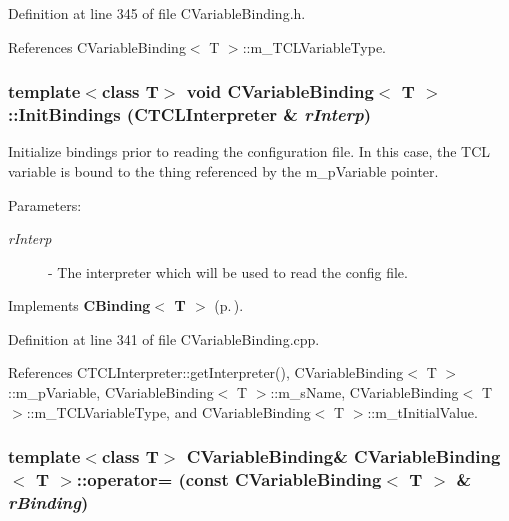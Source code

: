 Definition at line 345 of file CVariable\-Binding.h.

References CVariable\-Binding$<$ T $>$::m\_\-TCLVariable\-Type.
\subsubsection{\setlength{\rightskip}{0pt plus 5cm}template$<$class T$>$ void CVariable\-Binding$<$ T $>$::Init\-Bindings ({\bf CTCLInterpreter} \& {\em r\-Interp})\hspace{0.3cm}{\tt  [virtual]}}\label{classCVariableBinding_a13}


Initialize bindings prior to reading the configuration file. In this case, the TCL variable is bound to the thing referenced by the m\_\-p\-Variable pointer. \begin{Desc}
\item[Parameters: ]\par
\begin{description}
\item[{\em 
r\-Interp}]- The interpreter which will be used to read the config file. \end{description}
\end{Desc}


Implements {\bf CBinding$<$ T $>$} {\rm (p.\,\pageref{classCBinding_a0})}.

Definition at line 341 of file CVariable\-Binding.cpp.

References CTCLInterpreter::get\-Interpreter(), CVariable\-Binding$<$ T $>$::m\_\-p\-Variable, CVariable\-Binding$<$ T $>$::m\_\-s\-Name, CVariable\-Binding$<$ T $>$::m\_\-TCLVariable\-Type, and CVariable\-Binding$<$ T $>$::m\_\-t\-Initial\-Value.
\subsubsection{\setlength{\rightskip}{0pt plus 5cm}template$<$class T$>$ CVariable\-Binding\& CVariable\-Binding$<$ T $>$::operator= (const CVariable\-Binding$<$ T $>$ \& {\em r\-Binding})\hspace{0.3cm}{\tt  [private]}}\label{classCVariableBinding_c1}


